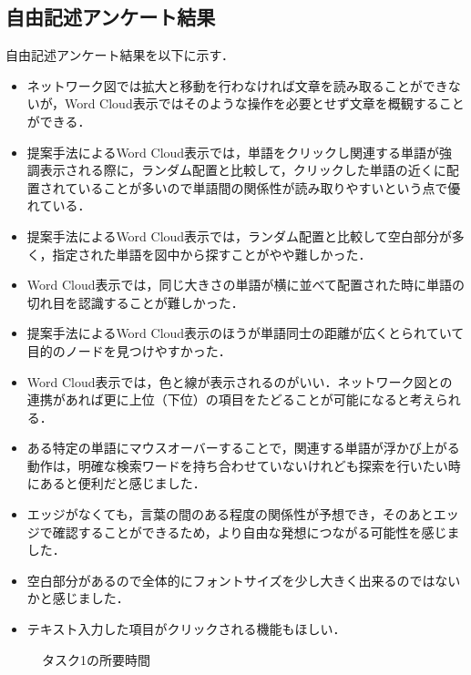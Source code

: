 \documentclass[syuuron]{kuee}
\begin{document}
		\subsection{自由記述アンケート結果}
		自由記述アンケート結果を以下に示す．
		\begin{itemize}
			\item ネットワーク図では拡大と移動を行わなければ文章を読み取ることができないが，Word Cloud表示ではそのような操作を必要とせず文章を概観することができる．
			\item 提案手法によるWord Cloud表示では，単語をクリックし関連する単語が強調表示される際に，ランダム配置と比較して，クリックした単語の近くに配置されていることが多いので単語間の関係性が読み取りやすいという点で優れている．
			\item 提案手法によるWord Cloud表示では，ランダム配置と比較して空白部分が多く，指定された単語を図中から探すことがやや難しかった．
			\item Word Cloud表示では，同じ大きさの単語が横に並べて配置された時に単語の切れ目を認識することが難しかった．
			\item 提案手法によるWord Cloud表示のほうが単語同士の距離が広くとられていて目的のノードを見つけやすかった．
			\item Word Cloud表示では，色と線が表示されるのがいい．ネットワーク図との連携があれば更に上位（下位）の項目をたどることが可能になると考えられる．
			\item ある特定の単語にマウスオーバーすることで，関連する単語が浮かび上がる動作は，明確な検索ワードを持ち合わせていないけれども探索を行いたい時にあると便利だと感じました．
			\item エッジがなくても，言葉の間のある程度の関係性が予想でき，そのあとエッジで確認することができるため，より自由な発想につながる可能性を感じました．
			\item 空白部分があるので全体的にフォントサイズを少し大きく出来るのではないかと感じました．
			\item テキスト入力した項目がクリックされる機能もほしい．
		\end{itemize}
		\begin{figure}
			\begin{center}
			\end{center}
			\caption{タスク1の所要時間}
	  		\label{fig:res1}
		\end{figure}
\end{document}
